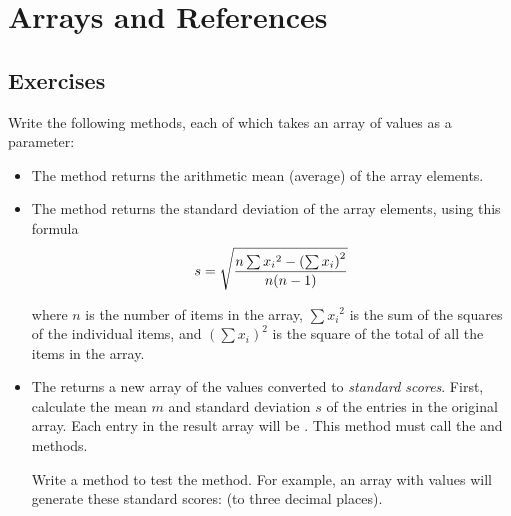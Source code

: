 \chapter{Arrays and References}

\section{Exercises}

\begin{exercise}
\label{ex:standardize}
Write the following methods, each of which takes an array of  values as a parameter:

\begin{itemize}
\item The  method returns the arithmetic mean (average) of the array elements.

\item The  method returns the standard deviation of the array elements, using this formula
\begin{equation*}
s = \sqrt {{n \sum{x_i} ^2 - \left(\sum{x_i}\right)^2} \over {n (n - 1)}}
\end{equation*}

where $n$ is the number of items in the array, $\sum{x_i} ^2$ is the sum of the squares of the individual items, and $\left(\sum{x_i}\right)^2$ is the square of the total of all the items in the array.

\item The  returns a new array of the values converted to {\em standard scores}. First, calculate the mean $m$ and standard deviation $s$ of the entries in the original array. Each entry in the result array will be . This method must call the  and  methods.

Write a  method to test the  method. For example, an array with values
 will generate these standard scores:  (to three decimal places). 

\end{itemize}
\end{exercise}

